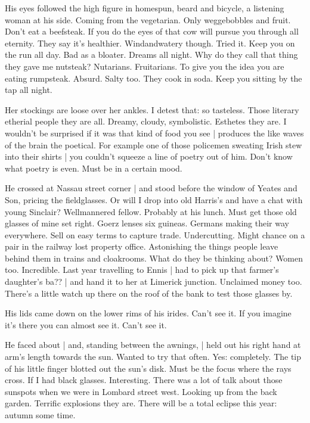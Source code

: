 His eyes followed the high figure in homespun,
beard and bicycle,
a listening woman at his side.
Coming from the vegetarian.
Only weggebobbles and fruit.
Don't eat a beefsteak.
If you do
the eyes of that cow will pursue you through all eternity.
They say it's healthier.
Windandwatery though.
Tried it.
Keep you on the run all day.
Bad as a bloater.
Dreams all night.
Why do they call that thing they gave me nutsteak?
Nutarians.
Fruitarians.
To give you the idea you are eating rumpsteak.
Absurd.
Salty too.
They cook in soda.
Keep you sitting by the tap all night.

Her stockings are loose over her ankles.
I detest that:
so tasteless.
Those literary etherial people they are all.
Dreamy,
cloudy,
symbolistic.
Esthetes they are.
I wouldn't be surprised if it was that kind of food you see |
produces the like waves of the brain the poetical.
For example
one of those policemen sweating Irish stew into their shirts |
you couldn't squeeze a line of poetry out of him.
Don't know what poetry is even.
Must be in a certain mood.

%

He crossed at Nassau street corner |
and stood before the window of Yeates and Son,
pricing the fieldglasses.
Or will I drop into old Harris's
and have a chat with young Sinclair?
Wellmannered fellow.
Probably at his lunch.
Must get those old glasses of mine set right.
Goerz lenses six guineas.
Germans making their way everywhere.
Sell on easy terms to capture trade.
Undercutting.
Might chance on a pair in the railway lost property office.
Astonishing the things people leave behind them in trains and cloakrooms.
What do they be thinking about?
Women too.
Incredible.
Last year travelling to Ennis |
had to pick up that farmer's daughter's ba?? |
and hand it to her at Limerick junction.
Unclaimed money too.
There's a little watch up there on the roof of the bank 
to test those glasses by.

His lids came down on the lower rims of his irides.
Can't see it.
If you imagine it's there you can almost see it.
Can't see it.

He faced about |
and, standing between the awnings, |
held out his right hand at arm's length towards the sun.
Wanted to try that often.
Yes:
completely.
The tip of his little finger blotted out the sun's disk.
Must be the focus where the rays cross.
If I had black glasses.
Interesting.
There was a lot of talk about those sunspots when we were in Lombard street west.
Looking up from the back garden.
Terrific explosions they are.
There will be a total eclipse this year:
autumn some time.

